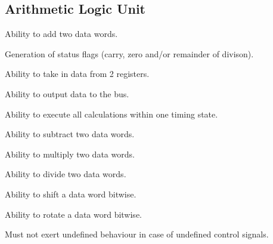 \subsection{Arithmetic Logic Unit}

\begin{turing-requirement}
  Ability to add two data words.
\end{turing-requirement}

\begin{turing-requirement}
  Generation of status flags (carry, zero and/or remainder of divison). 
\end{turing-requirement}

\begin{arch-requirement}
  Ability to take in data from 2 registers.
\end{arch-requirement}

\begin{arch-requirement}
  Ability to output data to the bus. 
\end{arch-requirement}

\begin{arch-requirement}
  Ability to execute all calculations within one timing state.
\end{arch-requirement}

\begin{feat-requirement}
  Ability to subtract two data words.
\end{feat-requirement}

\begin{feat-requirement}
  Ability to multiply two data words.
\end{feat-requirement}

\begin{feat-requirement}
  Ability to divide two data words.
\end{feat-requirement}

\begin{feat-requirement}
  Ability to shift a data word bitwise.
\end{feat-requirement}

\begin{feat-requirement}
  Ability to rotate a data word bitwise.
\end{feat-requirement}

\begin{feat-requirement}
  Must not exert undefined behaviour in case of undefined control signals. 
\end{feat-requirement}

